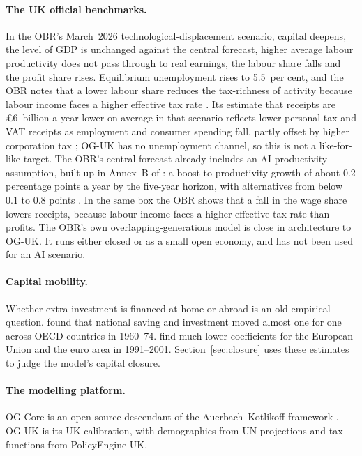 \paragraph{The UK official benchmarks.} In the OBR's March~2026 technological-displacement scenario, capital deepens, the level of GDP is unchanged against the central forecast, higher average labour productivity does not pass through to real earnings, the labour share falls and the profit share rises. Equilibrium unemployment rises to 5.5~per cent, and the OBR notes that a lower labour share reduces the tax-richness of activity because labour income faces a higher effective tax rate \citep[Box~2.2]{obr2026efo}. Its estimate that receipts are \pounds 6~billion a year lower on average in that scenario reflects lower personal tax and VAT receipts as employment and consumer spending fall, partly offset by higher corporation tax \citep[para~6.18]{obr2026efo}; OG-UK has no unemployment channel, so this is not a like-for-like target. The OBR's central forecast already includes an AI productivity assumption, built up in Annex~B of \citet{obr2025bp9}: a boost to productivity growth of about 0.2 percentage points a year by the five-year horizon, with alternatives from below 0.1 to 0.8 points \citep[Box~4.1]{obr2026frs}. In the same box the OBR shows that a fall in the wage share lowers receipts, because labour income faces a higher effective tax rate than profits. The OBR's own overlapping-generations model \citep{obr2025wp22} is close in architecture to OG-UK. It runs either closed or as a small open economy, and has not been used for an AI scenario.

\paragraph{Capital mobility.} Whether extra investment is financed at home or abroad is an old empirical question. \citet{feldsteinhorioka1980} found that national saving and investment moved almost one for one across OECD countries in 1960--74. \citet{blanchardgiavazzi2002} find much lower coefficients for the European Union and the euro area in 1991--2001. Section~\ref{sec:closure} uses these estimates to judge the model's capital closure.

\paragraph{The modelling platform.} OG-Core \citep{ogcore,debacker2019pfr} is an open-source descendant of the Auerbach--Kotlikoff framework \citep{auerbach1987}. OG-UK is its UK calibration, with demographics from UN projections and tax functions from PolicyEngine UK.
